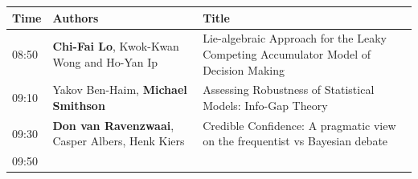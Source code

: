 \documentclass[]{article}
\begin{document}
\begin{longtable}[]{@{}lll@{}}
\toprule
\begin{minipage}[b]{0.03\columnwidth}\raggedright\strut
Time\strut
\end{minipage} & \begin{minipage}[b]{0.35\columnwidth}\raggedright\strut
Authors\strut
\end{minipage} & \begin{minipage}[b]{0.53\columnwidth}\raggedright\strut
Title\strut
\end{minipage}\tabularnewline
\midrule
\endhead
\begin{minipage}[t]{0.03\columnwidth}\raggedright\strut
08:50\strut
\end{minipage} & \begin{minipage}[t]{0.35\columnwidth}\raggedright\strut
\textbf{Chi-Fai Lo}, Kwok-Kwan Wong and Ho-Yan Ip\strut
\end{minipage} & \begin{minipage}[t]{0.53\columnwidth}\raggedright\strut
Lie-algebraic Approach for the Leaky Competing Accumulator Model of
Decision Making\strut
\end{minipage}\tabularnewline
\begin{minipage}[t]{0.03\columnwidth}\raggedright\strut
09:10\strut
\end{minipage} & \begin{minipage}[t]{0.35\columnwidth}\raggedright\strut
Yakov Ben-Haim, \textbf{Michael Smithson}\strut
\end{minipage} & \begin{minipage}[t]{0.53\columnwidth}\raggedright\strut
Assessing Robustness of Statistical Models: Info-Gap Theory\strut
\end{minipage}\tabularnewline
\begin{minipage}[t]{0.03\columnwidth}\raggedright\strut
09:30\strut
\end{minipage} & \begin{minipage}[t]{0.35\columnwidth}\raggedright\strut
\textbf{Don van Ravenzwaai}, Casper Albers, Henk Kiers\strut
\end{minipage} & \begin{minipage}[t]{0.53\columnwidth}\raggedright\strut
Credible Confidence: A pragmatic view on the frequentist vs Bayesian
debate\strut
\end{minipage}\tabularnewline
\begin{minipage}[t]{0.03\columnwidth}\raggedright\strut
09:50\strut
\end{minipage} & \begin{minipage}[t]{0.35\columnwidth}\raggedright\strut

\end{minipage}
\end{longtable}
\end{document}
